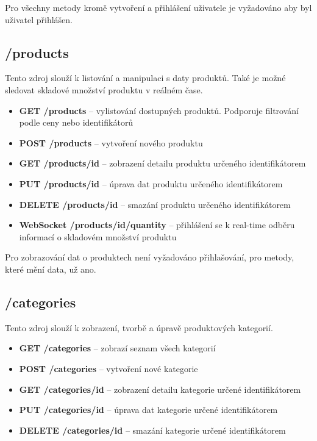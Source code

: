 \documentclass[thesis=M,czech]{FITthesis}[2019/12/23]
\begin{document}
Pro všechny metody kromě vytvoření a přihlášení uživatele je vyžadováno aby byl uživatel přihlášen.

\subsection{/products}
Tento zdroj slouží k listování a manipulaci s daty produktů. Také je možné sledovat skladové množství produktu v reálném čase.

\begin{itemize}
  \item \textbf{GET /products} -- vylistování dostupných produktů. Podporuje filtrování podle ceny nebo identifikátorů
  \item \textbf{POST /products} -- vytvoření nového produktu
  \item \textbf{GET /products/{id}} -- zobrazení detailu produktu určeného identifikátorem
  \item \textbf{PUT /products/{id}} -- úprava dat produktu určeného identifikátorem
  \item \textbf{DELETE /products/{id}} -- smazání produktu určeného identifikátorem
  \item \textbf{WebSocket /products/{id}/quantity} -- přihlášení se k real-time odběru informací o skladovém množství produktu
\end{itemize}

Pro zobrazování dat o produktech není vyžadováno přihlašování, pro metody, které mění data, už ano.

\subsection{/categories}
Tento zdroj slouží k zobrazení, tvorbě a úpravě produktových kategorií.

\begin{itemize}
  \item \textbf{GET /categories} -- zobrazí seznam všech kategorií
  \item \textbf{POST /categories} -- vytvoření nové kategorie
  \item \textbf{GET /categories/{id}} -- zobrazení detailu kategorie určené identifikátorem
  \item \textbf{PUT /categories/{id}} -- úprava dat kategorie určené identifikátorem
  \item \textbf{DELETE /categories/{id}} -- smazání kategorie určené identifikátorem
\end{itemize}
\end{document}
